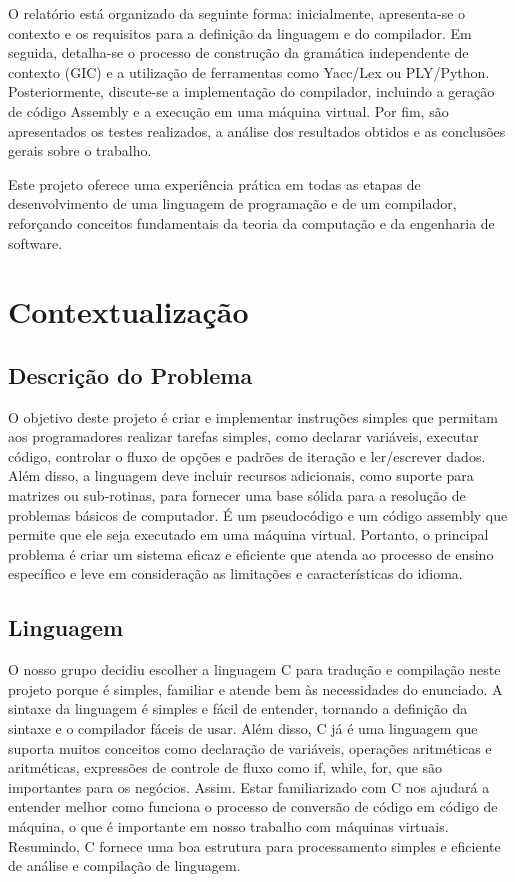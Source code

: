 \documentclass[12pt,a4paper]{report}
\begin{document}
O relatório está organizado da seguinte forma: inicialmente, apresenta-se o contexto e os requisitos para a definição da linguagem e do compilador. Em seguida, detalha-se o processo de construção da gramática independente de contexto (GIC) e a utilização de ferramentas como Yacc/Lex ou PLY/Python. Posteriormente, discute-se a implementação do compilador, incluindo a geração de código Assembly e a execução em uma máquina virtual. Por fim, são apresentados os testes realizados, a análise dos resultados obtidos e as conclusões gerais sobre o trabalho.

Este projeto oferece uma experiência prática em todas as etapas de desenvolvimento de uma linguagem de programação e de um compilador, reforçando conceitos fundamentais da teoria da computação e da engenharia de software.

\chapter{Contextualiza\c{c}\~{a}o}
\section{Descri\c{c}\~{a}o do Problema}
O objetivo deste projeto é criar e implementar instruções simples que permitam aos programadores realizar tarefas simples, como declarar variáveis, executar código, controlar o fluxo de opções e padrões de iteração e ler/escrever dados. Além disso, a linguagem deve incluir recursos adicionais, como suporte para matrizes ou sub-rotinas, para fornecer uma base sólida para a resolução de problemas básicos de computador. É um pseudocódigo e um código assembly que permite que ele seja executado em uma máquina virtual. Portanto, o principal problema é criar um sistema eficaz e eficiente que atenda ao processo de ensino específico e leve em consideração as limitações e características do idioma.
\section{Linguagem}
O nosso grupo decidiu escolher a linguagem C para tradução e compilação neste projeto porque é simples, familiar e atende bem às necessidades do enunciado. A sintaxe da linguagem é simples e fácil de entender, tornando a definição da sintaxe e o compilador fáceis de usar. Além disso, C já é uma linguagem que suporta muitos conceitos como declaração de variáveis, operações aritméticas e aritméticas, expressões de controle de fluxo como if, while, for, que são importantes para os negócios. Assim. Estar familiarizado com C nos ajudará a entender melhor como funciona o processo de conversão de código em código de máquina, o que é importante em nosso trabalho com máquinas virtuais. Resumindo, C fornece uma boa estrutura para processamento simples e eficiente de análise e compilação de linguagem.
\end{document}
